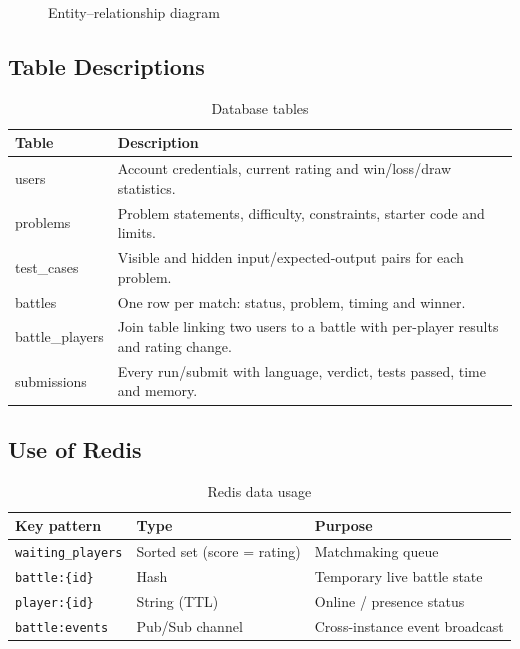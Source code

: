 \documentclass[12pt,a4paper,oneside]{report}
\begin{document}
\begin{figure}[H]
\caption{Entity--relationship diagram}
\label{fig:er}
\end{figure}

\subsection{Table Descriptions}
\begin{table}[H]
\centering
\small
\begin{tabularx}{\textwidth}{@{}lX@{}}
\toprule
\textbf{Table} & \textbf{Description} \\
\midrule
users          & Account credentials, current rating and win/loss/draw statistics. \\
problems       & Problem statements, difficulty, constraints, starter code and limits. \\
test\_cases    & Visible and hidden input/expected-output pairs for each problem. \\
battles        & One row per match: status, problem, timing and winner. \\
battle\_players& Join table linking two users to a battle with per-player results and rating change. \\
submissions    & Every run/submit with language, verdict, tests passed, time and memory. \\
\bottomrule
\end{tabularx}
\caption{Database tables}
\end{table}

\subsection{Use of Redis}
\begin{table}[H]
\centering
\small
\begin{tabularx}{\textwidth}{@{}llX@{}}
\toprule
\textbf{Key pattern} & \textbf{Type} & \textbf{Purpose} \\
\midrule
\texttt{waiting\_players}   & Sorted set (score = rating) & Matchmaking queue \\
\texttt{battle:\{id\}}      & Hash   & Temporary live battle state \\
\texttt{player:\{id\}}      & String (TTL) & Online / presence status \\
\texttt{battle:events}      & Pub/Sub channel & Cross-instance event broadcast \\
\bottomrule
\end{tabularx}
\caption{Redis data usage}
\end{table}
\end{document}
